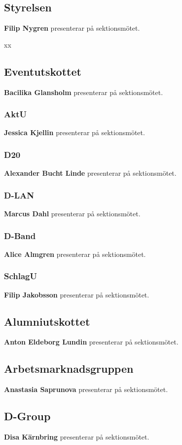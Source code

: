 \documentclass[../protokoll-vintermote-2024.tex]{subfiles}
\begin{document}
\subsection{Styrelsen}
\textbf{Filip Nygren} presenterar på sektionsmötet. 
 
xx

\subsection{Eventutskottet}
\textbf{Bacilika Glansholm} presenterar på sektionsmötet.


\subsubsection{AktU}
\textbf{Jessica Kjellin} presenterar på sektionsmötet.


\subsubsection{D20}
\textbf{Alexander Bucht Linde} presenterar på sektionsmötet. 


\subsubsection{D-LAN}
\textbf{Marcus Dahl} presenterar på sektionsmötet. 


\subsubsection{D-Band}
\textbf{Alice Almgren} presenterar på sektionsmötet. 


\subsubsection{SchlagU}
\textbf{Filip Jakobsson} presenterar på sektionsmötet. 


\subsection{Alumniutskottet}
\textbf{Anton Eldeborg Lundin} presenterar på sektionsmötet. 


\subsection{Arbetsmarknadsgruppen}
\textbf{Anastasia Saprunova} presenterar på sektionsmötet. 


\subsection{D-Group}
\textbf{Disa Kärnbring} presenterar på sektionsmötet.
\end{document}
